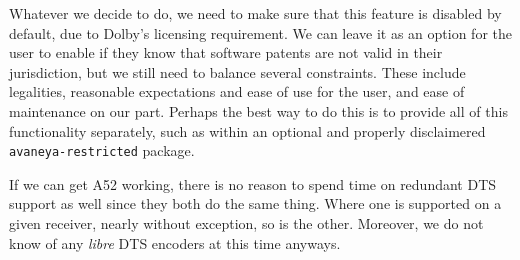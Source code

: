Whatever we decide to do, we need to make sure that this feature is disabled by default, due to Dolby's licensing requirement. We can leave it as an option for the user to enable if they know that software patents are not valid in their jurisdiction, but we still need to balance several constraints. These include legalities, reasonable expectations and ease of use for the user, and ease of maintenance on our part. Perhaps the best way to do this is to provide all of this functionality separately, such as within an optional and properly disclaimered {\tt avaneya-restricted} package.

If we can get A52 working, there is no reason to spend time on redundant DTS support as well since they both do the same thing. Where one is supported on a given receiver, nearly without exception, so is the other. Moreover, we do not know of any {\it libre} DTS encoders at this time anyways.

